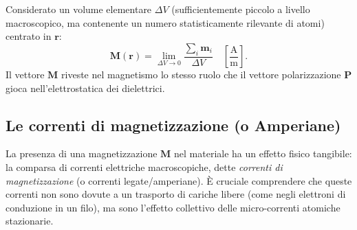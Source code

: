 \documentclass[a4paper,11pt]{report}
\begin{document}
Considerato un volume elementare $\Delta V$ (sufficientemente piccolo a livello macroscopico, ma contenente un numero statisticamente rilevante di atomi) centrato in $\bm{r}$:
\begin{equation}
    \bm{M}(\bm{r}) = \lim_{\Delta V \to 0} \frac{\sum_{i} \bm{m}_i}{\Delta V} \quad \left[ \frac{\text{A}}{\text{m}} \right].
\end{equation}
Il vettore $\bm{M}$ riveste nel magnetismo lo stesso ruolo che il vettore polarizzazione $\bm{P}$ gioca nell'elettrostatica dei dielettrici.

\subsection{Le correnti di magnetizzazione (o Amperiane)}
La presenza di una magnetizzazione $\bm{M}$ nel materiale ha un effetto fisico tangibile: la comparsa di correnti elettriche macroscopiche, dette \textit{correnti di magnetizzazione} (o correnti legate/amperiane).
È cruciale comprendere che queste correnti non sono dovute a un trasporto di cariche libere (come negli elettroni di conduzione in un filo), ma sono l'effetto collettivo delle micro-correnti atomiche stazionarie.
\end{document}
